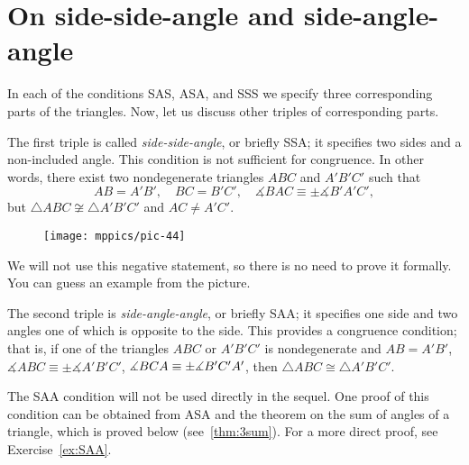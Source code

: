 


\section{On side-side-angle and side-angle-angle}

In each of the conditions SAS, ASA, and SSS we specify three corresponding parts of the triangles.
Now, let us discuss other triples of corresponding parts.

The first triple is called {}\emph{side-side-angle}, or briefly SSA;
it specifies two sides and a non-included angle.
This condition is not sufficient for congruence.
In other words, there exist two nondegenerate triangles $ABC$ and $A'B'C'$ such that
\[AB=A'B',\quad BC=B'C',\quad \measuredangle BAC\equiv\pm \measuredangle B'A'C',\]
but $\triangle ABC\not\cong\triangle A'B'C'$ and $AC\ne A'C'$.

\begin{wrapfigure}{r}{35mm}
\vskip-6mm
\centering
\texttt{[image: mppics/pic-44]}
\end{wrapfigure}

We will not use this negative statement, so there is no need to prove it formally.
You can guess an example from the picture.

The second triple is {}\emph{side-angle-angle}, or briefly SAA;
it specifies one side and two angles one of which is opposite to the side.
This provides a congruence condition; 
that is, if one of the triangles $ABC$ or $A'B'C'$ is nondegenerate and
$AB=A'B'$, $\measuredangle ABC\equiv\pm \measuredangle A'B'C'$, $\measuredangle BCA\equiv\pm \measuredangle B'C'A'$,
then $\triangle ABC\cong\triangle A'B'C'$.

The SAA condition will not be used directly in the sequel.
One proof of this condition can be obtained from ASA and the theorem on the sum of angles of a triangle, which is proved below (see~\ref{thm:3sum}). 
For a more direct proof, see Exercise~\ref{ex:SAA}.

